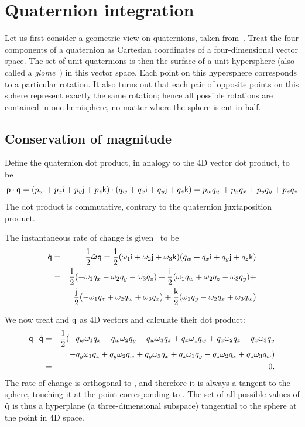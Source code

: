 \section{Quaternion integration\label{quatProofs}}

Let us first consider a geometric view on quaternions, taken from~\cite{Shoemake:85}. Treat
the four components of a quaternion as Cartesian coordinates of a four-dimensional vector
space. The set of unit quaternions is then the surface of a unit hypersphere (also called a
\emph{glome}~\cite{MathWorld:4D}) in this vector space. Each point on this hypersphere
corresponds to a particular rotation. It also turns out that each pair of
opposite points on this sphere represent exactly the same rotation; hence all possible
rotations are contained in one hemisphere, no matter where the sphere is cut in half.

\subsection{Conservation of magnitude\label{quatIntegrationMagnitude}}
Define the quaternion dot product, in analogy to the 4D vector dot product, to be
\begin{equation}
\mathsf{p}\cdot\mathsf{q} =
    (p_w + p_x\mathsf{i} + p_y\mathsf{j} + p_z\mathsf{k})\cdot (q_w + q_x\mathsf{i} + q_y\mathsf{j} + q_z\mathsf{k}) =
    p_w q_w + p_x q_x + p_y q_y + p_z q_z
\end{equation}
The dot product is commutative, contrary to the quaternion juxtaposition product.

The instantaneous rate of change is given~\cite{BaraffWitkin:97,Eberly:04,Saunders:PhD} to be
\begin{eqnarray*}
\dot{\q{q}} & = & \frac{1}{2}\tilde{\ve{\omega}}\q{q} =
    \frac{1}{2}(\omega_1\qi + \omega_2\qj + \omega_3\qk)
    (q_w + q_x\qi + q_y\qj + q_z\qk) \\*
& = & \frac{1}{2} ( - \omega_1 q_x - \omega_2 q_y - \omega_3 q_z ) +
    \frac{\qi}{2} ( \omega_1 q_w + \omega_2 q_z - \omega_3 q_y ) + \\*
&&  \frac{\qj}{2} (-\omega_1 q_z + \omega_2 q_w + \omega_3 q_x ) +
    \frac{\qk}{2} ( \omega_1 q_y - \omega_2 q_x + \omega_3 q_w )
\end{eqnarray*}

We now treat  and $\dot{\mathsf{q}}$ as 4D vectors and calculate
their dot product:
\begin{eqnarray*}
\mathsf{q}\cdot\dot{\mathsf{q}} & = & \frac{1}{2} (
    - q_w \omega_1 q_x - q_w \omega_2 q_y - q_w \omega_3 q_z
    + q_x \omega_1 q_w + q_x \omega_2 q_z - q_x \omega_3 q_y \\*
&&  - q_y \omega_1 q_z + q_y \omega_2 q_w + q_y \omega_3 q_x
    + q_z \omega_1 q_y - q_z \omega_2 q_x + q_z \omega_3 q_w ) \\*
& = & 0.
\end{eqnarray*}
The rate of change is orthogonal to , and therefore it is always
a tangent to the sphere, touching it at the point corresponding to . The set of all possible
values of $\dot{\mathsf{q}}$ is thus a hyperplane (a three-dimensional subspace) tangential to the
sphere at the point  in 4D space.

